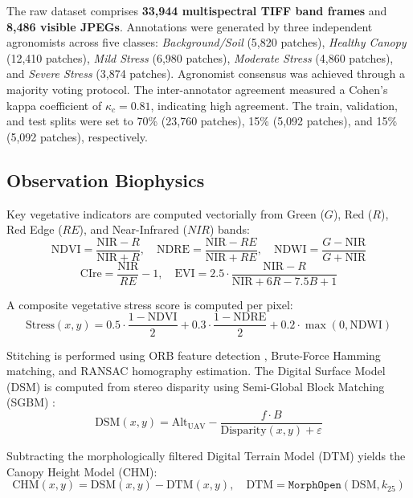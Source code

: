 \documentclass[review,3p,times,authoryear]{elsarticle}
\begin{document}
The raw dataset comprises \textbf{33,944 multispectral TIFF band frames} and \textbf{8,486 visible JPEGs}. Annotations were generated by three independent agronomists across five classes: \textit{Background/Soil} (5,820 patches), \textit{Healthy Canopy} (12,410 patches), \textit{Mild Stress} (6,980 patches), \textit{Moderate Stress} (4,860 patches), and \textit{Severe Stress} (3,874 patches). Agronomist consensus was achieved through a majority voting protocol. The inter-annotator agreement measured a Cohen's kappa coefficient of $\kappa_c = 0.81$, indicating high agreement. The train, validation, and test splits were set to 70\% (23,760 patches), 15\% (5,092 patches), and 15\% (5,092 patches), respectively.

\subsection{Observation Biophysics}
Key vegetative indicators are computed vectorially from Green ($G$), Red ($R$), Red Edge ($RE$), and Near-Infrared ($NIR$) bands:
\begin{equation}
\text{NDVI} = \frac{\text{NIR} - R}{\text{NIR} + R}, \quad \text{NDRE} = \frac{\text{NIR} - RE}{\text{NIR} + RE}, \quad \text{NDWI} = \frac{G - \text{NIR}}{G + \text{NIR}}
\end{equation}
\begin{equation}
\text{CIre} = \frac{\text{NIR}}{RE} - 1, \quad \text{EVI} = 2.5 \cdot \frac{\text{NIR} - R}{\text{NIR} + 6R - 7.5B + 1}
\end{equation}

A composite vegetative stress score is computed per pixel:
\begin{equation}
\text{Stress}(x,y) = 0.5 \cdot \frac{1 - \text{NDVI}}{2} + 0.3 \cdot \frac{1 - \text{NDRE}}{2} + 0.2 \cdot \max(0, \text{NDWI})
\end{equation}

Stitching is performed using ORB feature detection \citep{rublee2011orb}, Brute-Force Hamming matching, and RANSAC homography estimation. The Digital Surface Model (DSM) is computed from stereo disparity using Semi-Global Block Matching (SGBM) \citep{hirschmuller2007}:
\begin{equation}
\text{DSM}(x,y) = \text{Alt}_\text{UAV} - \frac{f \cdot B}{\text{Disparity}(x,y) + \varepsilon}
\end{equation}

Subtracting the morphologically filtered Digital Terrain Model (DTM) yields the Canopy Height Model (CHM):
\begin{equation}
\text{CHM}(x,y) = \text{DSM}(x,y) - \text{DTM}(x,y), \quad \text{DTM} = \mathtt{MorphOpen}(\text{DSM}, k_{25})
\end{equation}
\end{document}
